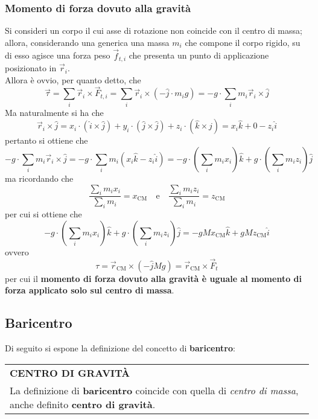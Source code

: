 \documentclass[a4paper]{extarticle}
\renewcommand\arraystretch{}
\begin{document}
\subsubsection{Momento di forza dovuto alla gravità}
Si consideri un corpo il cui asse di rotazione non coincide con il centro di massa; allora, considerando una generica una massa $m_i$ che compone il corpo rigido, su di esso agisce una forza peso $\vec f_{t,i}$ che presenta un punto di applicazione posizionato in $\vec r_i$.\\
Allora è ovvio, per quanto detto, che
\[\vec \tau = \sum_i \vec r_i \times \vec F_{t,i} = \sum_i \vec r_i \times (-\hat{j} \cdot m_i g) = -g \cdot \sum_i m_i \vec r_i \times \hat{j}\]
Ma naturalmente si ha che
\[\vec r_i \times \hat{j} = x_i \cdot (\hat{i} \times \hat{j}) + y_i \cdot (\hat{j} \times \hat{j}) + z_i \cdot (\hat{k} \times \hat{j}) = x_i \hat{k} + 0 - z_i \hat{i}\]
pertanto si ottiene che
\[-g \cdot \sum_i m_i \vec r_i \times \hat{j} = -g \cdot \sum_i m_i \left(x_i \hat{k} - z_i \hat{i}\right) = -g \cdot \left(\sum_i m_i x_i\right) \hat{k} + g \cdot \left(\sum_i m_i z_i\right) \hat{j}\]
ma ricordando che
\[\frac{\displaystyle{\sum_i m_i x_i}}{\displaystyle{\sum_i m_i}} = x_{\text{CM}} \hspace{1em} \text{e} \hspace{1em} \frac{\displaystyle{\sum_i m_i z_i}}{\displaystyle{\sum_i m_i}} = z_{\text{CM}}\]
per cui si ottiene che
\[-g \cdot \left(\sum_i m_i x_i\right) \hat{k} + g \cdot \left(\sum_i m_i z_i\right) \hat{j} = -g M x_{\text{CM}} \hat{k} + g M z_{\text{CM}} \hat{i}\]
ovvero
\[\boxed{\tau=\vec r_{\text{CM}} \times \left(- \hat{j} M g\right) = \vec r_{\text{CM}} \times \vec F_{t}}\]
per cui il \textbf{momento di forza dovuto alla gravità è uguale al momento di forza applicato solo sul centro di massa}.

\vspace{1em}
\subsection{Baricentro}
Di seguito si espone la definizione del concetto di \textbf{baricentro}:

\vspace{1em}
\setlength{\tabcolsep}{14pt}
\renewcommand{\arraystretch}{2}
\noindent
\begin{tabularx}{\textwidth}{@{}|P|@{}}
    \hline
    {\textbf{CENTRO DI GRAVITÀ}}\\
    \parbox{\linewidth}{La definizione di \textbf{baricentro} coincide con quella di \emph{centro di massa}, anche definito \textbf{centro di gravità}.
    \vspace{3mm}}\\
    \hline
\end{tabularx}
\end{document}
